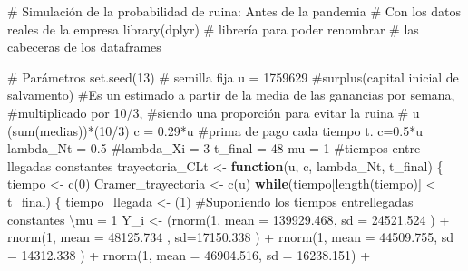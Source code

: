 \documentclass[
  us-letterpaper,
]{scrreprt}
\newenvironment{Shaded}{\begin{snugshade}}{\end{snugshade}}
\newcommand{\AttributeTok}[1]{\textcolor[rgb]{0.40,0.45,0.13}{#1}}
\newcommand{\CommentTok}[1]{\textcolor[rgb]{0.37,0.37,0.37}{#1}}
\newcommand{\ControlFlowTok}[1]{\textcolor[rgb]{0.00,0.23,0.31}{\textbf{#1}}}
\newcommand{\DecValTok}[1]{\textcolor[rgb]{0.68,0.00,0.00}{#1}}
\newcommand{\FloatTok}[1]{\textcolor[rgb]{0.68,0.00,0.00}{#1}}
\newcommand{\FunctionTok}[1]{\textcolor[rgb]{0.28,0.35,0.67}{#1}}
\newcommand{\NormalTok}[1]{\textcolor[rgb]{0.00,0.23,0.31}{#1}}
\newcommand{\OtherTok}[1]{\textcolor[rgb]{0.00,0.23,0.31}{#1}}
\newcommand{\SpecialCharTok}[1]{\textcolor[rgb]{0.37,0.37,0.37}{#1}}
\theoremstyle{plain}
\theoremstyle{plain}
\theoremstyle{definition}
\theoremstyle{remark}
\begin{document}
\begin{Shaded}
\begin{Highlighting}[]
\CommentTok{\# Simulación de la probabilidad de ruina: Antes de la pandemia}
\CommentTok{\# Con los datos reales de la empresa}
\FunctionTok{library}\NormalTok{(dplyr) }\CommentTok{\# librería para poder renombrar }
\CommentTok{\# las cabeceras de los dataframes}

\CommentTok{\# Parámetros}
\FunctionTok{set.seed}\NormalTok{(}\DecValTok{13}\NormalTok{) }\CommentTok{\# semilla fija}
\NormalTok{u }\OtherTok{=} \DecValTok{1759629} \CommentTok{\#surplus(capital inicial de salvamento)}
\CommentTok{\#Es un estimado a partir de la media de las ganancias por semana, }
\CommentTok{\#multiplicado por 10/3, }
\CommentTok{\#siendo una proporción para evitar la ruina}
\CommentTok{\# u (sum(medias))*(10/3)}
\NormalTok{c }\OtherTok{=} \FloatTok{0.29}\SpecialCharTok{*}\NormalTok{u }\CommentTok{\#prima de pago cada tiempo t. c=0.5*u}
\NormalTok{lambda\_Nt }\OtherTok{=} \FloatTok{0.5}
\CommentTok{\#lambda\_Xi = 3}
\NormalTok{t\_final }\OtherTok{=} \DecValTok{48}
\NormalTok{mu }\OtherTok{=} \DecValTok{1} \CommentTok{\#tiempos entre llegadas constantes}
\NormalTok{trayectoria\_CLt }\OtherTok{\textless{}{-}} \ControlFlowTok{function}\NormalTok{(u, c, lambda\_Nt, t\_final)}
\NormalTok{\{}
\NormalTok{  tiempo }\OtherTok{\textless{}{-}} \FunctionTok{c}\NormalTok{(}\DecValTok{0}\NormalTok{)}
\NormalTok{  Cramer\_trayectoria }\OtherTok{\textless{}{-}} \FunctionTok{c}\NormalTok{(u)}
  \ControlFlowTok{while}\NormalTok{(tiempo[}\FunctionTok{length}\NormalTok{(tiempo)] }\SpecialCharTok{\textless{}}\NormalTok{ t\_final)}
\NormalTok{  \{}
\NormalTok{    tiempo\_llegada }\OtherTok{\textless{}{-}}\NormalTok{ (}\DecValTok{1}\NormalTok{) }
\CommentTok{\#Suponiendo los tiempos entrellegadas constantes \textbackslash{}mu = 1}
\NormalTok{    Y\_i }\OtherTok{\textless{}{-}}\NormalTok{  (}\FunctionTok{rnorm}\NormalTok{(}\DecValTok{1}\NormalTok{, }\AttributeTok{mean =} \FloatTok{139929.468}\NormalTok{, }\AttributeTok{sd =} \FloatTok{24521.524}\NormalTok{ ) }\SpecialCharTok{+}
             \FunctionTok{rnorm}\NormalTok{(}\DecValTok{1}\NormalTok{, }\AttributeTok{mean =} \FloatTok{48125.734}\NormalTok{ , }\AttributeTok{sd=}\FloatTok{17150.338}\NormalTok{ )   }\SpecialCharTok{+}  
             \FunctionTok{rnorm}\NormalTok{(}\DecValTok{1}\NormalTok{, }\AttributeTok{mean =}  \FloatTok{44509.755}\NormalTok{, }\AttributeTok{sd =} \FloatTok{14312.338}\NormalTok{ ) }\SpecialCharTok{+} 
             \FunctionTok{rnorm}\NormalTok{(}\DecValTok{1}\NormalTok{, }\AttributeTok{mean =}   \FloatTok{46904.516}\NormalTok{, }\AttributeTok{sd =} \FloatTok{16238.151}\NormalTok{) }\SpecialCharTok{+} 

\end{Highlighting}
\end{Shaded}
\end{document}
